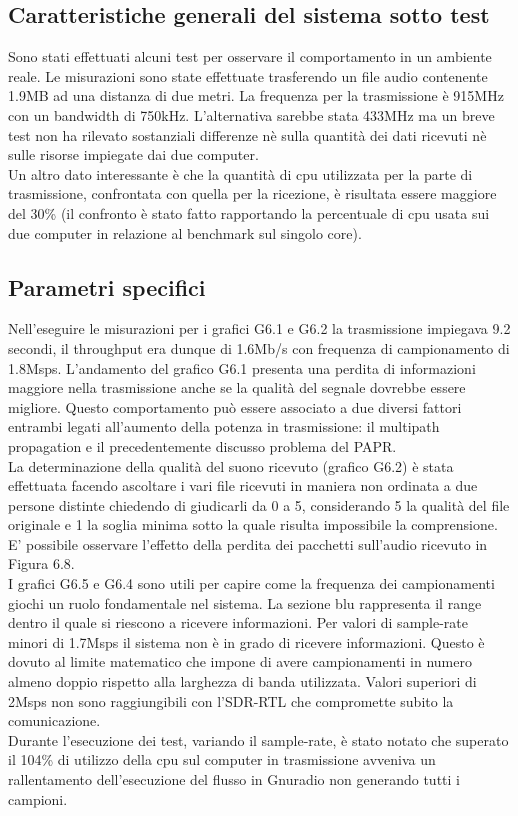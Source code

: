 \subsection{Caratteristiche generali del sistema sotto test}
 Sono stati effettuati alcuni test per osservare il comportamento in un ambiente reale. Le misurazioni sono state effettuate trasferendo un file audio contenente 1.9MB ad una distanza di due metri. La frequenza per la trasmissione è 915MHz con un bandwidth di 750kHz. L'alternativa sarebbe stata 433MHz ma un breve test non ha rilevato sostanziali differenze nè sulla quantità dei dati ricevuti nè sulle risorse impiegate dai due computer.
 \\Un altro dato interessante è che la quantità di cpu utilizzata per la parte di trasmissione, confrontata con quella per la ricezione, è risultata essere maggiore del 30\% (il confronto è stato fatto rapportando la percentuale di cpu usata sui due computer in relazione al benchmark sul singolo core).
 \subsection{Parametri specifici}
 Nell'eseguire le misurazioni per i grafici G6.1 e G6.2 la trasmissione impiegava 9.2 secondi, il throughput era dunque di 1.6Mb/s con frequenza di campionamento di 1.8Msps. L'andamento del grafico G6.1 presenta una perdita di informazioni maggiore nella trasmissione anche se la qualità del segnale dovrebbe essere migliore. Questo comportamento può essere associato a due diversi fattori entrambi legati all'aumento della potenza in trasmissione: il multipath propagation e il precedentemente discusso problema del PAPR.
 \\ La determinazione della qualità del suono ricevuto (grafico G6.2) è stata effettuata facendo ascoltare i vari file ricevuti in maniera non ordinata a due persone distinte chiedendo di giudicarli da 0 a 5, considerando 5 la qualità del file originale e 1 la soglia minima sotto la quale risulta impossibile la comprensione.
 E' possibile osservare l'effetto della perdita dei pacchetti sull'audio ricevuto in Figura 6.8.
 \\I grafici G6.5 e G6.4 sono utili per capire come la frequenza dei campionamenti giochi un ruolo fondamentale nel sistema.
 La sezione blu rappresenta il range dentro il quale si riescono a ricevere informazioni. Per valori di sample-rate minori di 1.7Msps il sistema non è in grado di ricevere informazioni. Questo è dovuto al limite matematico che impone di avere campionamenti in numero almeno doppio rispetto alla larghezza di banda utilizzata.
 Valori superiori di 2Msps non sono raggiungibili con l'SDR-RTL che compromette subito la comunicazione.
 \\Durante l'esecuzione dei test, variando il sample-rate, è stato notato che superato il 104\% di utilizzo della cpu sul computer in trasmissione avveniva un rallentamento dell'esecuzione del flusso in Gnuradio non generando tutti i campioni.
 
